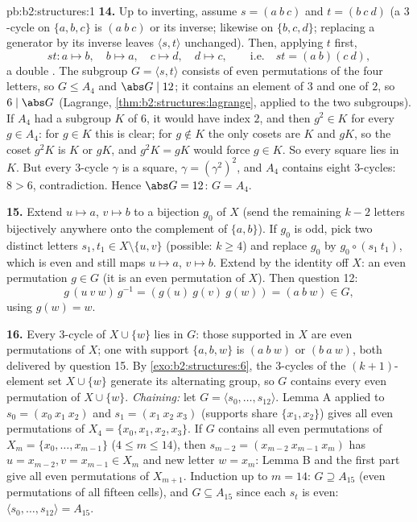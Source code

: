 \begin{solution}{pb:b2:structures:1}
\textbf{14.} Up to inverting, assume $s = (a\ b\ c)$ and $t =
(b\ c\ d)$ (a $3$-cycle on $\{a,b,c\}$ is $(a\ b\ c)$ or its
inverse; likewise on $\{b,c,d\}$; replacing a generator by its
inverse leaves $\langle s, t\rangle$ unchanged). Then, applying
$t$ first,
\[
st \colon a \mapsto b,\quad b \mapsto a,\quad c \mapsto d,\quad
d \mapsto c, \qquad\text{i.e.}\quad st = (a\ b)(c\ d),
\]
a double . The subgroup $G = \langle s, t\rangle$
consists of even permutations of the four letters, so $G \leq
A_4$ and $\abs G \mid 12$; it contains an element of  $3$
and one of  $2$, so $6 \mid \abs G$ (Lagrange,
\cref{thm:b2:structures:lagrange}, applied to the two 
subgroups). If $A_4$ had a subgroup $K$ of  $6$, it would
have index $2$, and then $g^2 \in K$ for every $g \in A_4$: for
$g \in K$ this is clear; for $g \notin K$ the only cosets are
$K$ and $gK$, so the coset $g^2K$ is $K$ or $gK$, and $g^2K =
gK$ would force $g \in K$. So every square lies in $K$. But every
$3$-cycle $\gamma$ is a square, $\gamma = (\gamma^2)^2$, and
$A_4$ contains eight $3$-cycles: $8 > 6$, contradiction. Hence
$\abs G = 12$: $G = A_4$.

\textbf{15.} Extend $u \mapsto a$, $v \mapsto b$ to a bijection
$g_0$ of $X$ (send the remaining $k - 2$ letters bijectively
anywhere onto the complement of $\{a, b\}$). If $g_0$ is odd,
pick two distinct letters $s_1, t_1 \in X \setminus \{u, v\}$
(possible: $k \geq 4$) and replace $g_0$ by $g_0 \circ (s_1\
t_1)$, which is even and still maps $u \mapsto a$, $v \mapsto
b$. Extend by the identity off $X$: an even permutation $g \in
G$ (it is an even permutation of $X$). Then question 12:
\[
g\,(u\ v\ w)\,g^{-1} = (g(u)\ g(v)\ g(w)) = (a\ b\ w) \in G,
\]
using $g(w) = w$.

\textbf{16.} Every $3$-cycle of $X \cup \{w\}$ lies in $G$:
those supported in $X$ are even permutations of $X$; one with
support $\{a, b, w\}$ is $(a\ b\ w)$ or $(b\ a\ w)$, both
delivered by question 15. By \cref{exo:b2:structures:6}, the
$3$-cycles of the $(k+1)$-element set $X \cup \{w\}$ generate
its alternating group, so $G$ contains every even permutation of
$X \cup \{w\}$. \emph{Chaining:} let $G = \langle s_0, \dots,
s_{12}\rangle$. Lemma A applied to $s_0 = (x_0\ x_1\ x_2)$ and
$s_1 = (x_1\ x_2\ x_3)$ (supports share $\{x_1, x_2\}$) gives
all even permutations of $X_4 = \{x_0, x_1, x_2, x_3\}$. If $G$
contains all even permutations of $X_m = \{x_0, \dots,
x_{m-1}\}$ ($4 \leq m \leq 14$), then $s_{m-2} = (x_{m-2}\
x_{m-1}\ x_m)$ has $u = x_{m-2}, v = x_{m-1} \in X_m$ and new
letter $w = x_m$: Lemma B and the first part give all even
permutations of $X_{m+1}$. Induction up to $m = 14$: $G \supseteq
A_{15}$ (even permutations of all fifteen cells), and $G
\subseteq A_{15}$ since each $s_t$ is even: $\langle s_0, \dots,
s_{12}\rangle = A_{15}$.


\end{solution}
